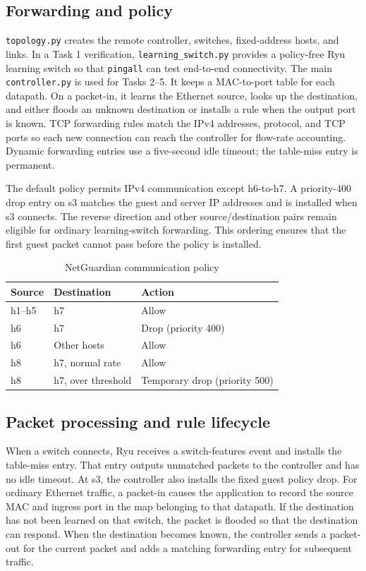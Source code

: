 \documentclass[conference]{IEEEtran}
\begin{document}
\subsection{Forwarding and policy}
\texttt{topology.py} creates the remote controller, switches, fixed-address hosts, and links. In a Task 1 verification, \texttt{learning\_switch.py} provides a policy-free Ryu learning switch so that \texttt{pingall} can test end-to-end connectivity. The main \texttt{controller.py} is used for Tasks 2--5. It keeps a MAC-to-port table for each datapath. On a packet-in, it learns the Ethernet source, looks up the destination, and either floods an unknown destination or installs a rule when the output port is known. TCP forwarding rules match the IPv4 addresses, protocol, and TCP ports so each new connection can reach the controller for flow-rate accounting. Dynamic forwarding entries use a five-second idle timeout; the table-miss entry is permanent.

The default policy permits IPv4 communication except h6-to-h7. A priority-400 drop entry on s3 matches the guest and server IP addresses and is installed when s3 connects. The reverse direction and other source/destination pairs remain eligible for ordinary learning-switch forwarding. This ordering ensures that the first guest packet cannot pass before the policy is installed.

\begin{table}[t]
\caption{NetGuardian communication policy}
\label{tab:policy}
\centering\small
\begin{tabular}{lll}
\toprule
Source & Destination & Action \\
\midrule
h1--h5 & h7 & Allow \\
h6 & h7 & Drop (priority 400) \\
h6 & Other hosts & Allow \\
h8 & h7, normal rate & Allow \\
h8 & h7, over threshold & Temporary drop (priority 500) \\
\bottomrule
\end{tabular}
\end{table}

\subsection{Packet processing and rule lifecycle}
When a switch connects, Ryu receives a switch-features event and installs the table-miss entry. That entry outputs unmatched packets to the controller and has no idle timeout. At s3, the controller also installs the fixed guest policy drop. For ordinary Ethernet traffic, a packet-in causes the application to record the source MAC and ingress port in the map belonging to that datapath. If the destination has not been learned on that switch, the packet is flooded so that the destination can respond. When the destination becomes known, the controller sends a packet-out for the current packet and adds a matching forwarding entry for subsequent traffic.
\end{document}

